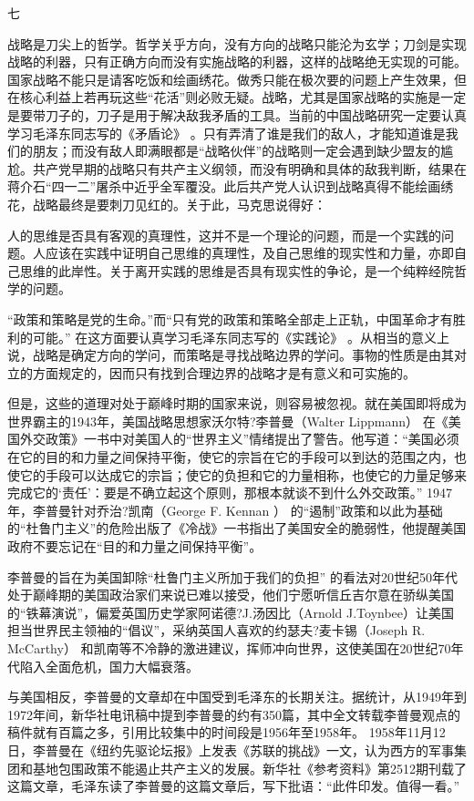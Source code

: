 \documentclass[UTF8, 12pt, a4paper]{ctexrep}
\begin{document}
七

战略是刀尖上的哲学。哲学关乎方向，没有方向的战略只能沦为玄学；刀剑是实现战略的利器，只有正确方向而没有实施战略的利器，这样的战略绝无实现的可能。国家战略不能只是请客吃饭和绘画绣花。做秀只能在极次要的问题上产生效果，但在核心利益上若再玩这些“花活”则必败无疑。战略，尤其是国家战略的实施是一定是要带刀子的，刀子是用于解决敌我矛盾的工具。当前的中国战略研究一定要认真学习毛泽东同志写的《矛盾论》 。只有弄清了谁是我们的敌人，才能知道谁是我们的朋友；而没有敌人即满眼都是“战略伙伴”的战略则一定会遇到缺少盟友的尴尬。共产党早期的战略只有共产主义纲领，而没有明确和具体的敌我判断，结果在蒋介石“四一二”屠杀中近乎全军覆没。此后共产党人认识到战略真得不能绘画绣花，战略最终是要刺刀见红的。关于此，马克思说得好：

人的思维是否具有客观的真理性，这并不是一个理论的问题，而是一个实践的问题。人应该在实践中证明自己思维的真理性，及自己思维的现实性和力量，亦即自己思维的此岸性。关于离开实践的思维是否具有现实性的争论，是一个纯粹经院哲学的问题。

“政策和策略是党的生命。”而“只有党的政策和策略全部走上正轨，中国革命才有胜利的可能。” 在这方面要认真学习毛泽东同志写的《实践论》 。从相当的意义上说，战略是确定方向的学问，而策略是寻找战略边界的学问。事物的性质是由其对立的方面规定的，因而只有找到合理边界的战略才是有意义和可实施的。

但是，这些的道理对处于巅峰时期的国家来说，则容易被忽视。就在美国即将成为世界霸主的1943年，美国战略思想家沃尔特?李普曼（Walter Lippmann） 在《美国外交政策》一书中对美国人的“世界主义”情绪提出了警告。他写道：“美国必须在它的目的和力量之间保持平衡，使它的宗旨在它的手段可以到达的范围之内，也使它的手段可以达成它的宗旨；使它的负担和它的力量相称，也使它的力量足够来完成它的‘责任’：要是不确立起这个原则，那根本就谈不到什么外交政策。” 1947年，李普曼针对乔治?凯南（George F. Kennan ） 的“遏制”政策和以此为基础的“杜鲁门主义”的危险出版了《冷战》一书指出了美国安全的脆弱性，他提醒美国政府不要忘记在“目的和力量之间保持平衡”。

李普曼的旨在为美国卸除“杜鲁门主义所加于我们的负担” 的看法对20世纪50年代处于巅峰期的美国政治家们来说已难以接受，他们宁愿听信丘吉尔意在骄纵美国的“铁幕演说”，偏爱英国历史学家阿诺德?J.汤因比（Arnold J.Toynbee）让美国担当世界民主领袖的“倡议”，采纳英国人喜欢的约瑟夫?麦卡锡（Joseph R. McCarthy） 和凯南等不冷静的激进建议，挥师冲向世界，这使美国在20世纪70年代陷入全面危机，国力大幅衰落。

与美国相反，李普曼的文章却在中国受到毛泽东的长期关注。据统计，从1949年到1972年间，新华社电讯稿中提到李普曼的约有350篇，其中全文转载李普曼观点的稿件就有百篇之多，引用比较集中的时间段是1956年至1958年。 1958年11月12日，李普曼在《纽约先驱论坛报》上发表《苏联的挑战》一文，认为西方的军事集团和基地包围政策不能遏止共产主义的发展。新华社《参考资料》第2512期刊载了这篇文章，毛泽东读了李普曼的这篇文章后，写下批语：“此件印发。值得一看。”
\end{document}
